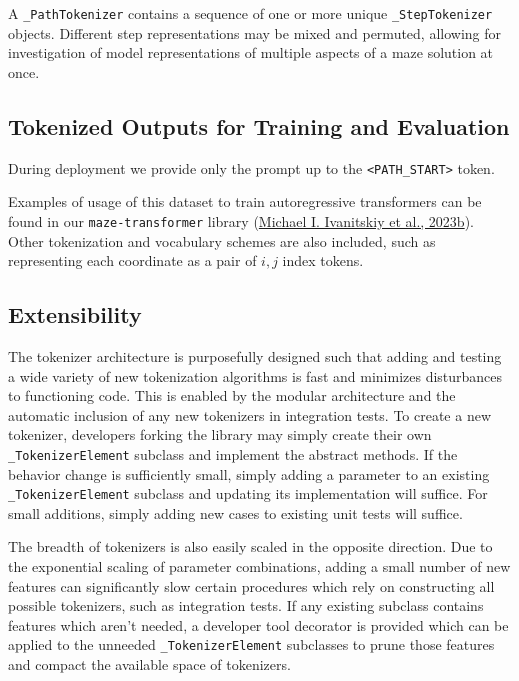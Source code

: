 \documentclass[10pt,a4paper,onecolumn]{article}
\begin{document}
A \texttt{\_PathTokenizer} contains a sequence of one or more unique
\texttt{\_StepTokenizer} objects. Different step representations may be
mixed and permuted, allowing for investigation of model representations
of multiple aspects of a maze solution at once.

\hypertarget{token-training}{%
\subsection{Tokenized Outputs for Training and
Evaluation}\label{token-training}}

During deployment we provide only the prompt up to the
\texttt{\textless{}PATH\_START\textgreater{}} token.

Examples of usage of this dataset to train autoregressive transformers
can be found in our \texttt{maze-transformer} library
(\protect\hyperlink{ref-maze-transformer-github}{Michael I. Ivanitskiy
et al., 2023b}). Other tokenization and vocabulary schemes are also
included, such as representing each coordinate as a pair of \(i,j\)
index tokens.

\hypertarget{extensibility}{%
\subsection{Extensibility}\label{extensibility}}

The tokenizer architecture is purposefully designed such that adding and
testing a wide variety of new tokenization algorithms is fast and
minimizes disturbances to functioning code. This is enabled by the
modular architecture and the automatic inclusion of any new tokenizers
in integration tests. To create a new tokenizer, developers forking the
library may simply create their own \texttt{\_TokenizerElement} subclass
and implement the abstract methods. If the behavior change is
sufficiently small, simply adding a parameter to an existing
\texttt{\_TokenizerElement} subclass and updating its implementation
will suffice. For small additions, simply adding new cases to existing
unit tests will suffice.

The breadth of tokenizers is also easily scaled in the opposite
direction. Due to the exponential scaling of parameter combinations,
adding a small number of new features can significantly slow certain
procedures which rely on constructing all possible tokenizers, such as
integration tests. If any existing subclass contains features which
aren't needed, a developer tool decorator is provided which can be
applied to the unneeded \texttt{\_TokenizerElement} subclasses to prune
those features and compact the available space of tokenizers.
\end{document}
